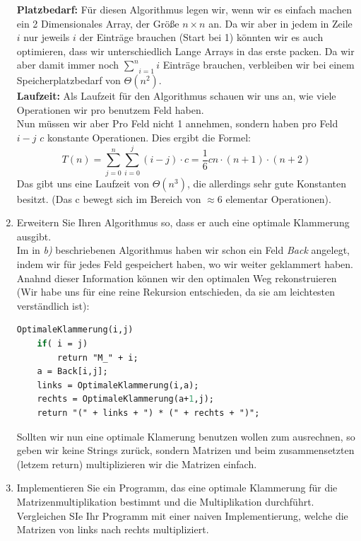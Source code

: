 \documentclass[11pt,a4paper,ngerman]{article}
\begin{document}
\begin{enumerate}[\bfseries (a)]
\textbf{Platzbedarf:} Für diesen Algorithmus legen wir, wenn wir es einfach machen ein 2 Dimensionales Array, der Größe $n \times n$ an. Da wir aber in jedem in Zeile $i$ nur jeweils $i$ der Einträge brauchen (Start bei 1) könnten wir es auch optimieren, dass wir unterschiedlich Lange Arrays in das erste packen. Da wir aber damit immer noch $\underset{i=1}{\overset{n}{\sum}} i$ Einträge brauchen, verbleiben wir bei einem Speicherplatzbedarf von $\Theta (n^2)$.\\

\textbf{Laufzeit:} Als Laufzeit für den Algorithmus schauen wir uns an, wie viele Operationen wir pro benutzem Feld haben.\\
Nun müssen wir aber Pro Feld nicht 1 annehmen, sondern haben pro Feld $i-j$ $c$ konstante Operationen. Dies ergibt die Formel:
$$
T(n) = \sum_{j=0}^{n} \sum_{i=0}^{j} (i-j) \cdot c = \frac{1}{6} cn \cdot (n + 1) \cdot (n + 2)
$$ 
Das gibt uns eine Laufzeit von $\Theta(n^3)$, die allerdings sehr gute Konstanten besitzt. (Das c bewegt sich im Bereich von $\approx 6$ elementar Operationen).

\item Erweitern Sie Ihren Algorithmus so, dass er auch eine optimale Klammerung ausgibt.\\

Im in \emph{b)} beschriebenen Algorithmus haben wir schon ein Feld \emph{Back} angelegt, indem wir für jedes Feld gespeichert haben, wo wir weiter geklammert haben. Anahnd dieser Information können wir den optimalen Weg rekonstruieren (Wir habe uns für eine reine Rekursion entschieden, da sie am leichtesten verständlich ist):

\begin{lstlisting}[language=Pascal]
OptimaleKlammerung(i,j)
	if( i = j)
		return "M_" + i;
	a = Back[i,j];
	links = OptimaleKlammerung(i,a);
	rechts = OptimaleKlammerung(a+1,j);
	return "(" + links + ") * (" + rechts + ")";
\end{lstlisting}

Sollten wir nun eine optimale Klamerung benutzen wollen zum ausrechnen, so geben wir keine Strings zurück, sondern Matrizen und beim zusammensetzten (letzem return) multiplizieren wir die Matrizen einfach.

\pagebreak

\item Implementieren Sie ein Programm, das eine optimale Klammerung für die Matrizenmultiplikation bestimmt und die Multiplikation durchführt. Vergleichen SIe Ihr Programm mit einer naiven Implementierung, welche die Matrizen von links nach rechts multipliziert.


\end{enumerate}
\end{document}
